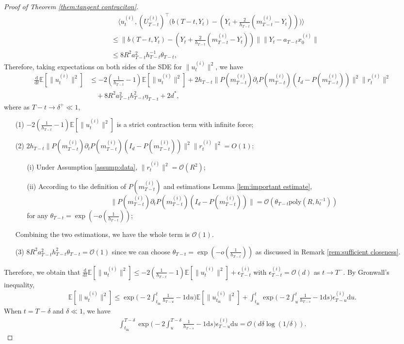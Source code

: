 \documentclass[11pt]{article}
\newcommand{\mb}{\mathbb}
\newcommand{\dee}{\mathrm{d}}
\newcommand{\mc}{\mathcal}
\newcommand{\tin}{t_{\mathrm{in}}}
\begin{document}
\begin{proof}[Proof of Theorem \ref{them:tangent contraciton}]
\begin{align*}
    &\quad \langle u_t^{(i)}, (U_{T-t}^{(i)})^\intercal\big( b(T-t,Y_t)- ( Y_t +\frac{2}{h_{T-t}}(m_{T-t}^{(i)}-Y_t) ) \big)\rangle \\
    & \le \| b(T-t,Y_t)- ( Y_t +\frac{2}{h_{T-t}}(m_{T-t}^{(i)}-Y_t) ) \| \| Y_t - a_{T-t}x_0^{(i)} \| \\
    &\le 8 R^2 a_{T-t}^2 h_{T-t}^{-1} \theta_{T-t},
\end{align*}
Therefore, taking expectations on both sides of the SDE for $\| u_t^{(i)} \|^2$, we have
\begin{align*}
     \frac{\dee}{\dee t} \mb{E}[\| u_t^{(i)} \|^2]  &\le -2(\frac{1}{h_{T-t}}-1)\mb{E}[\| u_t^{(i)} \|^2] + 2h_{T-t}\|P(m_{T-t}^{(i)}) \partial_t P(m_{T-t}^{(i)}) (I_d-P(m_{T-t}^{(i)})) \|^2 \| r_t^{(i)} \|^2\\
     &\quad+ 8 R^2 a_{T-t}^2 h_{T-t}^2 \eta_{T-t} + 2d^*,
\end{align*}
where as $T-t\to \delta^+\ll 1$,
\begin{itemize}
    \item [(1)] $-2(\frac{1}{h_{T-t}}-1)\mb{E}[\| u_t^{(i)} \|^2]$ is a strict contraction term with infinite force;
    \item [(2)] $2h_{T-t}\|P(m_{T-t}^{(i)}) \partial_t P(m_{T-t}^{(i)}) (I_d-P(m_{T-t}^{(i)})) \|^2 \| r_t^{(i)} \|^2=O(1)$: 
     \begin{itemize}
         \item [(i)] Under Assumption \ref{assump:data}, $\| r_t^{(i)} \|^2 = \mc{O}(R^2)$;
         \item [(ii)] According to the definition of $P(m_{T-t}^{(i)})$ and estimations Lemma \ref{lem:important estimate}, $$\|P(m_{T-t}^{(i)}) \partial_t P(m_{T-t}^{(i)}) (I_d-P(m_{T-t}^{(i)})) \|=\mc{O}(\theta_{T-t} \mathrm{poly}(R,h_t^{-1}))$$ for any $\theta_{T-t}=\exp(-o(\tfrac{1}{h_{T-t}}))$; 
     \end{itemize} 
     Combining the two estimations, we have the whole term is $\mc{O}(1)$. 
    \item [(3)] $8 R^2 a_{T-t}^2 h_{T-t}^2 \theta_{T-t}=\mc{O}(1)$ since we can choose $\theta_{T-t}=\exp(-o(\tfrac{1}{h_{T-t}}))$ as discussed in Remark \ref{rem:sufficient closeness}.
\end{itemize}
Therefore, we obtain that $\frac{\dee}{\dee t} \mb{E}[\| u_t^{(i)} \|^2]  \le -2(\tfrac{1}{h_{T-t}}-1)\mb{E}[\| u_t^{(i)} \|^2] + \epsilon_{T-t}^{(i)} $ with $\epsilon_{T-t}^{(i)}=\mc{O}(d)$ as $t\to T^-$. By Gronwall's inequality,
\begin{align*}
    \mb{E}[\| u_t^{(i)} \|^2]  \le  \exp\big( - 2\int_{\tin}^t \frac{1}{h_{T-u}}-1 \dee u\big) \mb{E}[\| u_{\tin}^{(i)} \|^2] + \int_{\tin}^t \exp\big( -2\int_u^t \frac{1}{h_{T-s}}-1 \dee s\big) \epsilon_{T-u}^{(i)}\dee u.
\end{align*}
When $t=T-\delta$ and $\delta\ll 1$, we have
\begin{align*}
 \int_{\tin}^{T-\delta} \exp\big( -2\int_u^{T-\delta} \frac{1}{h_{T-s}}-1 \dee s\big) \epsilon_{T-u}^{(i)}\dee u =\mc{O}( d\delta \log (1/\delta) ) .
\end{align*}


\end{proof}
\end{document}
